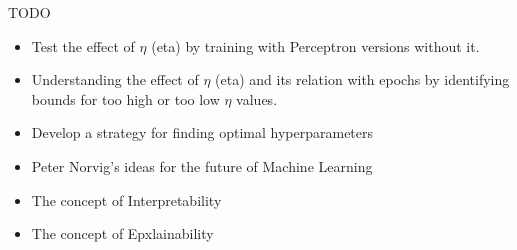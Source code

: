 \begin{flushleft}
\begin{flushleft}
\end{flushleft}


TODO

\begin{itemize}
  \item Test the effect of $\eta$ (eta) by training with Perceptron versions without it.
  \item Understanding the effect of $\eta$ (eta) and its relation with epochs by identifying bounds for too high or too low $\eta$ values.
  \item Develop a strategy for finding optimal hyperparameters
  \item Peter Norvig's ideas for the future of Machine Learning 
  \item The concept of Interpretability
  \item The concept of Epxlainability
\end{itemize}




\end{flushleft}




